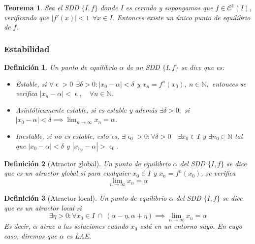 \documentclass[11pt, a4paper]{article}
\newif\IfInSansMode
\let\epsilon\upvarepsilon
\numberwithin{equation}{section}
\theoremstyle{theorem-style}
\newtheorem{nth}{Teorema}[section]
\theoremstyle{definition-style}
\newtheorem{ndef}{Definición}[section]
\theoremstyle{remark-style}
\theoremstyle{example-style}
\begin{document}
\begin{nth}
	Sea el SDD $\{I,f\}$ donde $I$ es cerrado y supongamos que $f\in \mathcal{C}^1(I)$, verificando que $|f'(x)|< 1 \ \ \forall x \in I$. Entonces existe un único punto de equilibrio de $f$.
\end{nth}

\subsubsection{Estabilidad}
\begin{ndef}
	Un punto de equilibrio $\alpha$ de un SDD $\{I,f\}$ se dice que es:
	\begin{itemize}
	\item Estable, si $\forall \epsilon > 0 \ \ \exists \delta > 0 : |x_0 - \alpha| < \delta$ y $x_n = f^n(x_0),\ n \in \mathbb{N},$ entonces se verifica $|x_n - \alpha| < \epsilon, \quad \forall n \in \mathbb{N}$.
	\item Asintóticamente estable, si es estable y además $\exists \delta > 0 :$ si $|x_0 - \alpha| < \delta \implies \lim_{n\to \infty}x_n = \alpha$.
	\item Inestable, si no es estable, esto es, $\exists \epsilon_0 > 0 : \forall \delta > 0\quad \exists x_0 \in I$ y $\exists n_0 \in \mathbb{N}$ tal que $|x_0 - \alpha| < \delta$ y $|x_{n_0} - \alpha| > \epsilon_0$.
\end{itemize}
\end{ndef}

\begin{ndef}[Atractor global]
	Un punto de equilibrio $\alpha$ del SDD $\{I,f\}$ se dice que es un atractor global si para cualquier $x_0 \in I$ y $x_n=f^n(x_0)$, se verifica $$\lim_{n \rightarrow \infty} x_n = \alpha$$
\end{ndef}	

\begin{ndef}[Atractor local]
	Un punto de equilibrio $\alpha$ del SDD $\{I,f\}$ se dice que es un atractor local si 
$$\exists \eta > 0 : \forall x_0 \in I\ \cap\ (\alpha-\eta, \alpha+\eta) \implies \lim_{n \rightarrow \infty}x_n=\alpha$$
Es decir, $\alpha$ atrae a las soluciones cuando $x_0$ está en un entorno suyo. En cuyo caso, diremos que $\alpha$ es LAE.
\end{ndef}
\end{document}
